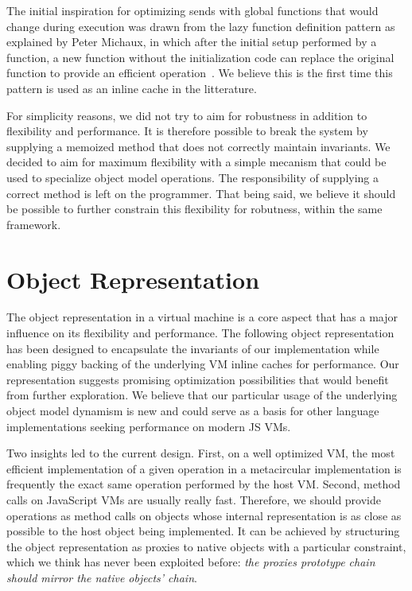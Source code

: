 The initial inspiration for optimizing sends with global functions that would
change during execution was drawn from the lazy function definition pattern as
explained by Peter Michaux, in which after the initial setup performed by a
function, a new function without the initialization code can replace the
original function to provide an efficient
operation~\cite{michaux:LazyFunctionDefinitionPattern}. We believe this is the
first time this pattern is used as an inline cache in the litterature.

For simplicity reasons, we did not try to aim for robustness in addition to
flexibility and performance. It is therefore possible to break the system by
supplying a memoized method that does not correctly maintain invariants. We
decided to aim for maximum flexibility with a simple mecanism that could be
used to specialize object model operations. The responsibility of supplying a
correct method is left on the programmer. That being said, we believe it should
be possible to further constrain this flexibility for robutness, within the
same framework.

\section{Object Representation}
\label{sec:ObjectRepresentation}

The object representation in a virtual machine is a core aspect that has a
major influence on its flexibility and performance. The following object
representation has been designed to encapsulate the invariants of our
implementation while enabling piggy backing of the underlying VM inline
caches for performance. Our representation suggests promising optimization
possibilities that would benefit from further exploration. We believe that our
particular usage of the underlying object model dynamism is new and could serve
as a basis for other language implementations seeking performance on modern JS
VMs.

Two insights led to the current design. First, on a well optimized VM, the most
efficient implementation of a given operation in a metacircular implementation
is frequently the exact same operation performed by the host VM. Second, method
calls on JavaScript VMs are usually really fast. Therefore, we should provide
operations as method calls on objects whose internal representation is as close
as possible to the host object being implemented. It can be achieved by
structuring the object representation as proxies to native objects with a
particular constraint, which we think has never been exploited before:
\textit{the proxies prototype chain should mirror the native objects' chain}.

